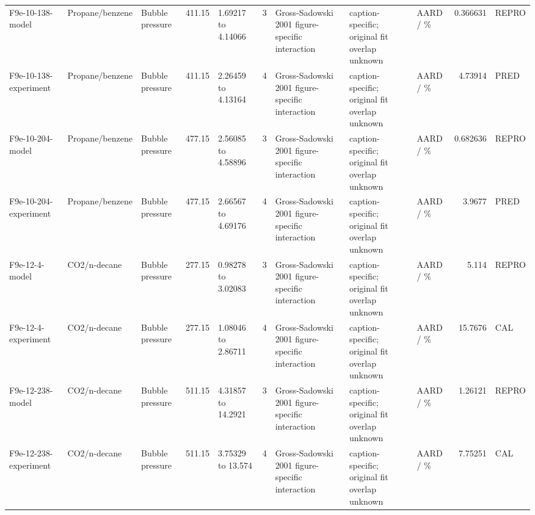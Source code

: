 \begin{landscape}
\begin{longtable}{L{1.9cm}L{2.5cm}L{2.1cm}L{1.6cm}L{1.6cm}rL{2.4cm}L{1.9cm}L{2.2cm}rL{1cm}}
F9e-\allowbreak{}10-\allowbreak{}138-\allowbreak{}model & Propane/\allowbreak{}benzene & Bubble pressure & 411.15 & 1.69217 to 4.14066 & 3 & Gross-\allowbreak{}Sadowski 2001 figure-\allowbreak{}specific interaction & caption-\allowbreak{}specific; original fit overlap unknown & AARD /\allowbreak{} \% & 0.366631 & REPRO \\
F9e-\allowbreak{}10-\allowbreak{}138-\allowbreak{}experiment & Propane/\allowbreak{}benzene & Bubble pressure & 411.15 & 2.26459 to 4.13164 & 4 & Gross-\allowbreak{}Sadowski 2001 figure-\allowbreak{}specific interaction & caption-\allowbreak{}specific; original fit overlap unknown & AARD /\allowbreak{} \% & 4.73914 & PRED \\
F9e-\allowbreak{}10-\allowbreak{}204-\allowbreak{}model & Propane/\allowbreak{}benzene & Bubble pressure & 477.15 & 2.56085 to 4.58896 & 3 & Gross-\allowbreak{}Sadowski 2001 figure-\allowbreak{}specific interaction & caption-\allowbreak{}specific; original fit overlap unknown & AARD /\allowbreak{} \% & 0.682636 & REPRO \\
F9e-\allowbreak{}10-\allowbreak{}204-\allowbreak{}experiment & Propane/\allowbreak{}benzene & Bubble pressure & 477.15 & 2.66567 to 4.69176 & 4 & Gross-\allowbreak{}Sadowski 2001 figure-\allowbreak{}specific interaction & caption-\allowbreak{}specific; original fit overlap unknown & AARD /\allowbreak{} \% & 3.9677 & PRED \\
F9e-\allowbreak{}12-\allowbreak{}4-\allowbreak{}model & CO2/\allowbreak{}n-\allowbreak{}decane & Bubble pressure & 277.15 & 0.98278 to 3.02083 & 3 & Gross-\allowbreak{}Sadowski 2001 figure-\allowbreak{}specific interaction & caption-\allowbreak{}specific; original fit overlap unknown & AARD /\allowbreak{} \% & 5.114 & REPRO \\
F9e-\allowbreak{}12-\allowbreak{}4-\allowbreak{}experiment & CO2/\allowbreak{}n-\allowbreak{}decane & Bubble pressure & 277.15 & 1.08046 to 2.86711 & 4 & Gross-\allowbreak{}Sadowski 2001 figure-\allowbreak{}specific interaction & caption-\allowbreak{}specific; original fit overlap unknown & AARD /\allowbreak{} \% & 15.7676 & CAL \\
F9e-\allowbreak{}12-\allowbreak{}238-\allowbreak{}model & CO2/\allowbreak{}n-\allowbreak{}decane & Bubble pressure & 511.15 & 4.31857 to 14.2921 & 3 & Gross-\allowbreak{}Sadowski 2001 figure-\allowbreak{}specific interaction & caption-\allowbreak{}specific; original fit overlap unknown & AARD /\allowbreak{} \% & 1.26121 & REPRO \\
F9e-\allowbreak{}12-\allowbreak{}238-\allowbreak{}experiment & CO2/\allowbreak{}n-\allowbreak{}decane & Bubble pressure & 511.15 & 3.75329 to 13.574 & 4 & Gross-\allowbreak{}Sadowski 2001 figure-\allowbreak{}specific interaction & caption-\allowbreak{}specific; original fit overlap unknown & AARD /\allowbreak{} \% & 7.75251 & CAL \\

\end{longtable}
\end{landscape}
